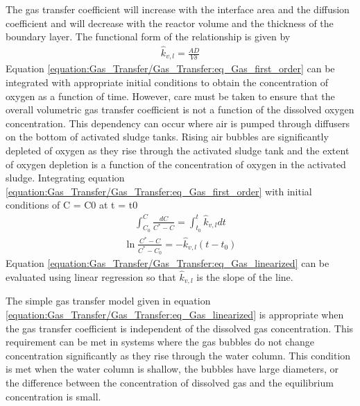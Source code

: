 \documentclass[letterpaper,10pt,english]{sphinxmanual}
\begin{document}
The gas transfer coefficient will increase with the interface area and the diffusion coefficient and will decrease with the reactor volume and the thickness of the boundary layer. The functional form of the relationship is given by
\begin{equation}\label{equation:Gas_Transfer/Gas_Transfer:Gas_Transfer/Gas_Transfer:1}
\begin{split}\hat{k}_{v,l} =\frac{AD}{V\delta }\end{split}
\end{equation}
Equation \eqref{equation:Gas_Transfer/Gas_Transfer:eq_Gas_first_order} can be integrated with appropriate initial conditions to obtain the concentration of oxygen as a function of time. However, care must be taken to ensure that the overall volumetric gas transfer coefficient is not a function of the dissolved oxygen concentration. This dependency can occur where air is pumped through diffusers on the bottom of activated sludge tanks. Rising air bubbles are significantly depleted of oxygen as they rise through the activated sludge tank and the extent of oxygen depletion is a function of the concentration of oxygen in the activated sludge. Integrating equation \eqref{equation:Gas_Transfer/Gas_Transfer:eq_Gas_first_order} with initial conditions of C = C0 at t = t0
\begin{equation}\label{equation:Gas_Transfer/Gas_Transfer:Gas_Transfer/Gas_Transfer:2}
\begin{split}\int _{C_{0} }^{C}\frac{dC}{C^{*} -C}  =\int _{t_{0} }^{t}\hat{k}_{v,l} dt\end{split}
\end{equation}\begin{equation}\label{equation:Gas_Transfer/Gas_Transfer:eq_Gas_linearized}
\begin{split} \ln \frac{C^{*} -C}{C^{*} -C_{0} } =-\hat{k}_{v,l} (t-t_{0} )\end{split}
\end{equation}
Equation \eqref{equation:Gas_Transfer/Gas_Transfer:eq_Gas_linearized} can be evaluated using linear regression so that \(\hat{k}_{v,l}\) is the slope of the line.

The simple gas transfer model given in equation \eqref{equation:Gas_Transfer/Gas_Transfer:eq_Gas_linearized} is appropriate when the gas transfer coefficient is independent of the dissolved gas concentration. This requirement can be met in systems where the gas bubbles do not change concentration significantly as they rise through the water column. This condition is met when the water column is shallow, the bubbles have large diameters, or the difference between the concentration of dissolved gas and the equilibrium concentration is small.
\end{document}
